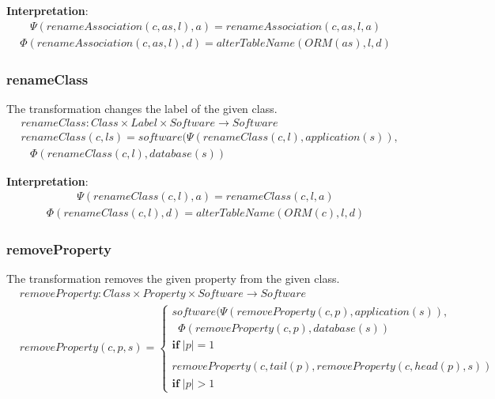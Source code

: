 \documentclass[10pt]{article}
\begin{document}
\noindent \textbf{Interpretation}:
\begin{align}
\Psi(renameAssociation(c, as, l), a) = renameAssociation(c, as, l, a)
\end{align}
\begin{align}
\Phi(renameAssociation(c, as, l), d) = alterTableName(ORM(as), l, d)
\end{align}

\subsubsection{renameClass}
The transformation changes the label of the given class.
\begin{align}
& renameClass: Class \times Label \times Software \rightarrow Software \nonumber \\
& renameClass(c, l s) = software(\Psi(renameClass(c, l), application(s)), \nonumber \\
& \;\;\; \Phi(renameClass(c, l), database(s))
\end{align}

\noindent \textbf{Interpretation}:
\begin{align}
\Psi(renameClass(c, l), a) = renameClass(c, l, a)
\end{align}
\begin{align}
\Phi(renameClass(c, l), d) = alterTableName(ORM(c), l, d)
\end{align}

\subsubsection{removeProperty}
The transformation removes the given property from the given class.
\begin{align}
& removeProperty: Class \times Property \times Software \rightarrow Software \nonumber \\
& removeProperty(c, p, s) = \begin{cases}
    software(\Psi(removeProperty(c, p), application(s)),  \\ 
        \;\; \Phi(removeProperty(c, p), database(s)) \\
    \mathbf{if} \; |p| = 1 \\\\
    removeProperty(c, tail(p), removeProperty(c, head(p), s)) \\
        \mathbf{if} \; |p| > 1
 \end{cases}
\end{align}
\end{document}
